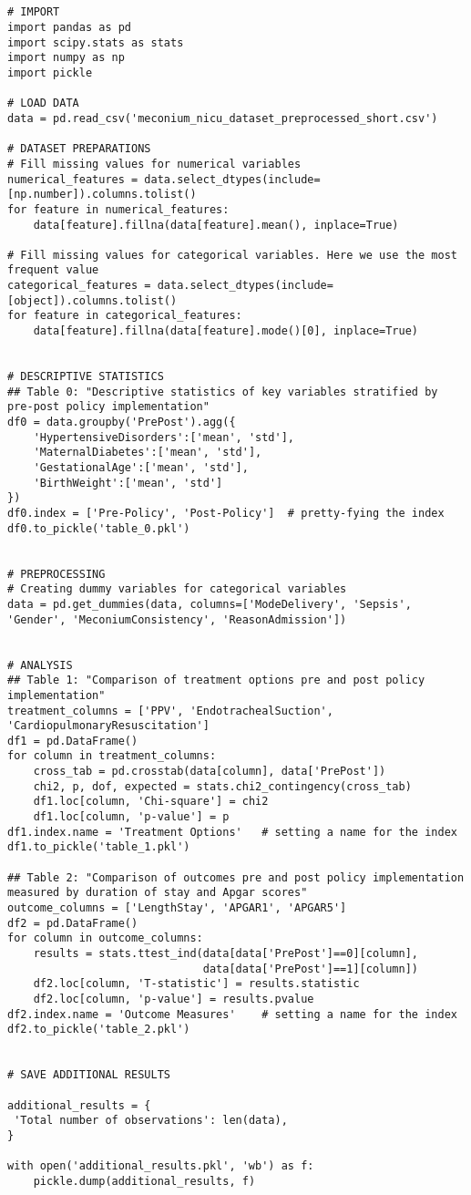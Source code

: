 \documentclass[11pt]{article}
\begin{document}
\begin{verbatim}


# IMPORT
import pandas as pd
import scipy.stats as stats
import numpy as np
import pickle

# LOAD DATA
data = pd.read_csv('meconium_nicu_dataset_preprocessed_short.csv')

# DATASET PREPARATIONS
# Fill missing values for numerical variables
numerical_features = data.select_dtypes(include=[np.number]).columns.tolist()
for feature in numerical_features:
    data[feature].fillna(data[feature].mean(), inplace=True)

# Fill missing values for categorical variables. Here we use the most frequent value
categorical_features = data.select_dtypes(include=[object]).columns.tolist()
for feature in categorical_features:
    data[feature].fillna(data[feature].mode()[0], inplace=True)


# DESCRIPTIVE STATISTICS
## Table 0: "Descriptive statistics of key variables stratified by pre-post policy implementation"
df0 = data.groupby('PrePost').agg({
    'HypertensiveDisorders':['mean', 'std'],
    'MaternalDiabetes':['mean', 'std'],
    'GestationalAge':['mean', 'std'], 
    'BirthWeight':['mean', 'std']
})
df0.index = ['Pre-Policy', 'Post-Policy']  # pretty-fying the index
df0.to_pickle('table_0.pkl')


# PREPROCESSING 
# Creating dummy variables for categorical variables
data = pd.get_dummies(data, columns=['ModeDelivery', 'Sepsis', 'Gender', 'MeconiumConsistency', 'ReasonAdmission'])


# ANALYSIS
## Table 1: "Comparison of treatment options pre and post policy implementation"
treatment_columns = ['PPV', 'EndotrachealSuction', 'CardiopulmonaryResuscitation']
df1 = pd.DataFrame()
for column in treatment_columns:
    cross_tab = pd.crosstab(data[column], data['PrePost'])
    chi2, p, dof, expected = stats.chi2_contingency(cross_tab)
    df1.loc[column, 'Chi-square'] = chi2
    df1.loc[column, 'p-value'] = p
df1.index.name = 'Treatment Options'   # setting a name for the index
df1.to_pickle('table_1.pkl')

## Table 2: "Comparison of outcomes pre and post policy implementation measured by duration of stay and Apgar scores"
outcome_columns = ['LengthStay', 'APGAR1', 'APGAR5']
df2 = pd.DataFrame()
for column in outcome_columns:
    results = stats.ttest_ind(data[data['PrePost']==0][column], 
                              data[data['PrePost']==1][column])
    df2.loc[column, 'T-statistic'] = results.statistic
    df2.loc[column, 'p-value'] = results.pvalue
df2.index.name = 'Outcome Measures'    # setting a name for the index
df2.to_pickle('table_2.pkl')


# SAVE ADDITIONAL RESULTS

additional_results = {
 'Total number of observations': len(data), 
}

with open('additional_results.pkl', 'wb') as f:
    pickle.dump(additional_results, f)

\end{verbatim}
\end{document}
